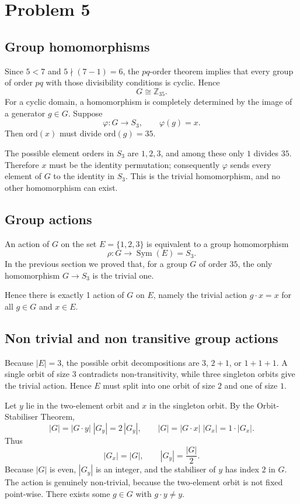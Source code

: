 \documentclass[12pt]{article}
\begin{document}
\section*{Problem 5}
\subsection*{Group homomorphisms}
Since \(5<7\) and \(5\nmid(7-1)=6\), the $pq$-order theorem implies that every group of order \(pq\) with those divisibility conditions is cyclic.  Hence
\[
G \cong \mathbb Z_{35}.
\]
For a cyclic domain, a homomorphism is completely determined by the image of a generator \(g\in G\).  Suppose
\[
\varphi : G \longrightarrow S_{3},\qquad \varphi(g)=x.
\]
Then \(\mathrm{ord}(x)\) must divide \(\mathrm{ord}(g)=35\).

The possible element orders in \(S_{3}\) are \(1,2,3\), and among these only \(1\) divides \(35\).  Therefore \(x\) must be the identity permutation; consequently \(\varphi\) sends every element of \(G\) to the identity in \(S_{3}\).  This is the trivial homomorphism, and no other homomorphism can exist.

\subsection*{Group actions}

An action of \(G\) on the set \(E=\{1,2,3\}\) is equivalent to a group homomorphism
\[
\rho : G \longrightarrow \operatorname{Sym}(E)=S_{3}.
\]
In the previous section we proved that, for a group \(G\) of order \(35\), the only homomorphism \(G\to S_{3}\) is the trivial one.  

Hence there is exactly 1 action of \(G\) on \(E\), namely the trivial action \(g\cdot x = x\) for all \(g\in G\) and \(x\in E\).

\subsection*{Non trivial and non transitive group actions}
Because \(|E| = 3\), the possible orbit decompositions are
\(3\), \(2+1\), or \(1+1+1\).
A single orbit of size \(3\) contradicts non-transitivity, while
three singleton orbits give the trivial action.
Hence \(E\) must split into one orbit of size \(2\) and one of size \(1\).

Let \(y\) lie in the two-element orbit and \(x\) in the singleton orbit.
By the Orbit-Stabiliser Theorem,
\[
|G| = |G\!\cdot\!y|\;|G_{y}| = 2\,|G_{y}|,\qquad
|G| = |G\!\cdot\!x|\;|G_{x}| = 1\cdot |G_{x}|.
\]
Thus
\[
|G_{x}| = |G|,\qquad |G_{y}| = \frac{|G|}{2}.
\]
Because \(|G|\) is even, \(|G_{y}|\) is an integer, and
the stabiliser of \(y\) has index \(2\) in \(G\).
The action is genuinely non-trivial, because the two-element orbit is not fixed point-wise. There exists some \(g\in G\) with \(g\!\cdot\!y \neq y\).
\end{document}
